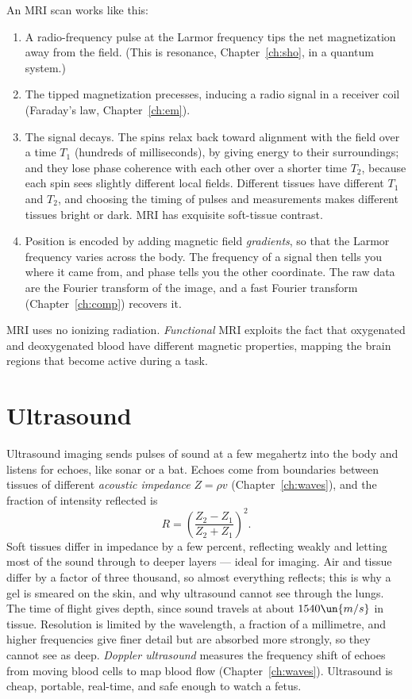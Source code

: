 An MRI scan works like this:
\begin{enumerate}[itemsep=3pt]
  \item A radio-frequency pulse at the Larmor frequency tips the net magnetization away from the field. (This is resonance, Chapter~\ref{ch:sho}, in a quantum system.)
  \item The tipped magnetization precesses, inducing a radio signal in a receiver coil (Faraday's law, Chapter~\ref{ch:em}).
  \item The signal decays. The spins relax back toward alignment with the field over a time $T_1$ (hundreds of milliseconds), by giving energy to their surroundings; and they lose phase coherence with each other over a shorter time $T_2$, because each spin sees slightly different local fields. Different tissues have different $T_1$ and $T_2$, and choosing the timing of pulses and measurements makes different tissues bright or dark. MRI has exquisite soft-tissue contrast.
  \item Position is encoded by adding magnetic field \emph{gradients}, so that the Larmor frequency varies across the body. The frequency of a signal then tells you where it came from, and phase tells you the other coordinate. The raw data are the Fourier transform of the image, and a fast Fourier transform (Chapter~\ref{ch:comp}) recovers it.
\end{enumerate}
MRI uses no ionizing radiation. \emph{Functional} MRI exploits the fact that oxygenated and deoxygenated blood have different magnetic properties, mapping the brain regions that become active during a task.

\section{Ultrasound}

Ultrasound imaging sends pulses of sound at a few megahertz into the body and listens for echoes, like sonar or a bat. Echoes come from boundaries between tissues of different \emph{acoustic impedance} $Z = \rho v$ (Chapter~\ref{ch:waves}), and the fraction of intensity reflected is
\[
  R = \left(\frac{Z_2 - Z_1}{Z_2 + Z_1}\right)^2 .
\]
Soft tissues differ in impedance by a few percent, reflecting weakly and letting most of the sound through to deeper layers --- ideal for imaging. Air and tissue differ by a factor of three thousand, so almost everything reflects; this is why a gel is smeared on the skin, and why ultrasound cannot see through the lungs. The time of flight gives depth, since sound travels at about $1540\un{m/s}$ in tissue. Resolution is limited by the wavelength, a fraction of a millimetre, and higher frequencies give finer detail but are absorbed more strongly, so they cannot see as deep. \emph{Doppler ultrasound} measures the frequency shift of echoes from moving blood cells to map blood flow (Chapter~\ref{ch:waves}). Ultrasound is cheap, portable, real-time, and safe enough to watch a fetus.

